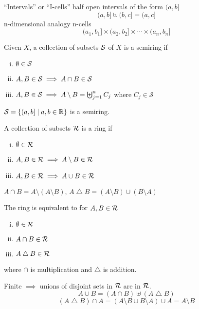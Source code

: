 ``Intervals'' or ``I-cells'' half open intervals of the form $(a, b]$
\[(a, b] \uplus (b, c] = (a, c]\]
n-dimensional analogy n-cells
\[(a_1, b_1] \times (a_2, b_2] \times \dotsm \times (a_n, b_n]\]

\begin{definition}[Semiring]
  Given $X$, a collection of subsets $\mathcal S$ of $X$ is a semiring if 
  \begin{enumerate}[(i)]
    \item $\emptyset \in \mathcal S$
    \item $A, B \in \mathcal S \implies A \cap B \in \mathcal S$
    \item $A, B \in \mathcal S \implies A \setminus B = \biguplus_{j=1}^n C_j$ where $C_j \in \mathcal{S}$
  \end{enumerate}
\end{definition}

\begin{example}
  $\mathcal S = \{(a, b] \mid a, b \in \mathbb R\}$ is a semiring.
\end{example}

\begin{definition}[Ring]
  A collection of subsets $\mathcal R$ is a ring if 
  \begin{enumerate}[(i)]
    \item $\emptyset \in \mathcal R$
    \item $A, B \in \mathcal R \implies A \setminus B \in \mathcal R$
    \item $A, B \in \mathcal R \implies A \cup B \in \mathcal R$
  \end{enumerate}
\end{definition}

\begin{remark}
  $A \cap B = A \setminus (A \setminus B)$, $A \bigtriangleup B = (A \setminus B) \cup (B \setminus A)$
  
  The ring is equivalent to for $A, B \in \mathcal R$
  \begin{enumerate}[(i)]
    \item $\emptyset \in \mathcal R$
    \item $A \cap B \in \mathcal R$
    \item $A \bigtriangleup B \in \mathcal R$
  \end{enumerate}
  where $\cap$ is multiplication and $\bigtriangleup$ is addition.

  Finite $\implies$ unions of disjoint sets in $\mathcal R$ are in $\mathcal R$.
  \[A \cup B = (A \cap B) \uplus (A \bigtriangleup B)\]
  \[(A \bigtriangleup B)\cap A = (A \setminus B \cup B \setminus A) \cup A = A \setminus B\]
\end{remark}
  
